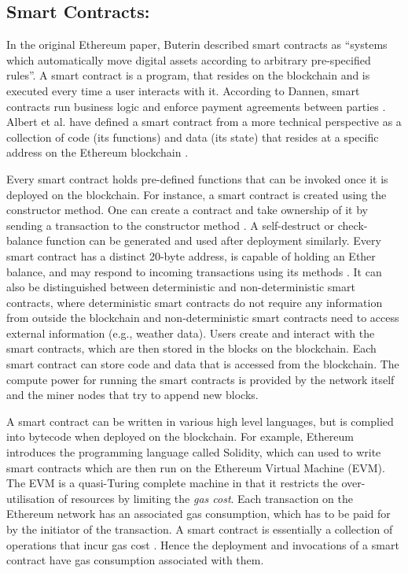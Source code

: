 \documentclass[10pt,conference]{IEEEtran}
\begin{document}
	\subsection{Smart Contracts:}
	In the original Ethereum paper, Buterin described smart contracts as “systems which automatically move digital assets according to arbitrary pre-specified rules”\cite{ethpaper}. A smart contract is a program, that resides on the blockchain and is executed every time a user interacts with it. According to Dannen, smart contracts run business logic and enforce payment agreements between parties \cite{bitcoinbook}. Albert et al. have defined a smart contract from a more technical perspective as a collection of code (its functions) and data (its state) that resides at a specific address on the Ethereum blockchain \cite{gasol}. 
	
	Every smart contract holds pre-defined functions that can be invoked once it is deployed on the blockchain. For instance, a smart contract is created using the constructor method. One can create a contract and take ownership of it by sending a transaction to the constructor method \cite{wood2019ethereum, khanblockchain}. A self-destruct or check-balance function can be generated and used after deployment similarly. Every smart contract has a distinct 20-byte address, is capable of holding an Ether balance, and may respond to incoming transactions using its methods \cite{alharbyblockchain}. It can also be distinguished between deterministic and non-deterministic smart contracts, where deterministic smart contracts do not require any information from outside the blockchain and non-deterministic smart contracts need to access external information (e.g., weather data)\cite{morabito}. Users create and interact with the smart contracts, which are then stored in the blocks on the blockchain. Each smart contract can store code and data that is accessed from the blockchain. The compute power for running the smart contracts is provided by the network itself and the miner nodes that try to append new blocks.
	
	A smart contract can be written in various high level languages, but is complied into bytecode when deployed on the blockchain. For example, Ethereum introduces the programming language called Solidity, which can used to write smart contracts which are then run on the Ethereum Virtual Machine (EVM). The EVM is a quasi-Turing complete machine \cite{wood2019ethereum} in that it restricts the over-utilisation of resources by limiting the \textit{gas cost}. Each transaction on the Ethereum network has an associated gas consumption, which has to be paid for by the initiator of the transaction. A smart contract is essentially a collection of operations that incur gas cost \cite{wood2019ethereum}. Hence the deployment and invocations of a smart contract have gas consumption associated with them.
	
\end{document}
